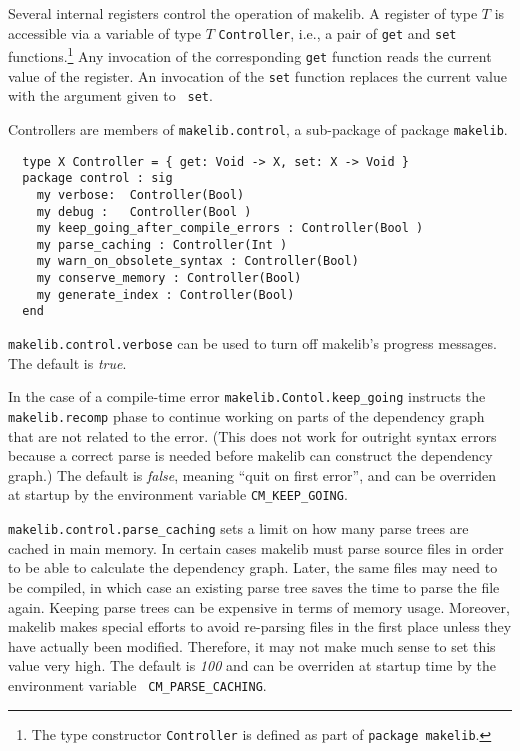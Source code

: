 Several internal registers control the operation of makelib.  A register of
type $T$ is accessible via a variable of type $T$ {\tt Controller},
i.e., a pair of {\tt get} and {\tt set} functions.\footnote{The type
constructor {\tt Controller} is defined as part of {\tt package
makelib}.}  Any invocation of the corresponding {\tt get} function reads
the current value of the register.  An invocation of the {\tt set}
function replaces the current value with the argument given to {\tt
set}.

Controllers are members of {\tt makelib.control}, a sub-package of
package {\tt makelib}.

\begin{verbatim}
  type X Controller = { get: Void -> X, set: X -> Void }
  package control : sig
    my verbose:  Controller(Bool) 
    my debug :   Controller(Bool )
    my keep_going_after_compile_errors : Controller(Bool )
    my parse_caching : Controller(Int )
    my warn_on_obsolete_syntax : Controller(Bool)
    my conserve_memory : Controller(Bool)
    my generate_index : Controller(Bool)
  end
\end{verbatim}

{\tt makelib.control.verbose} can be used to turn off makelib's progress
messages.  The default is {\em true}.

In the case of a compile-time error {\tt makelib.Contol.keep\_going}
instructs the {\tt makelib.recomp} phase to continue working on parts of
the dependency graph that are not related to the error.  (This does
not work for outright syntax errors because a correct parse is needed
before makelib can construct the dependency graph.)  The default is {\em
false}, meaning ``quit on first error'', and can be overriden at
startup by the environment variable {\tt CM\_KEEP\_GOING}.

{\tt makelib.control.parse\_caching} sets a limit on how many parse trees
are cached in main memory.  In certain cases makelib must parse source
files in order to be able to calculate the dependency graph.  Later,
the same files may need to be compiled, in which case an existing
parse tree saves the time to parse the file again.  Keeping parse
trees can be expensive in terms of memory usage.  Moreover, makelib makes
special efforts to avoid re-parsing files in the first place unless
they have actually been modified.  Therefore, it may not make much
sense to set this value very high.  The default is {\em 100} and can
be overriden at startup time by the environment variable {\tt
CM\_PARSE\_CACHING}.


